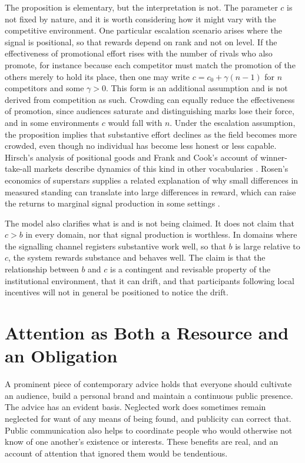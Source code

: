 \documentclass[11pt]{article}
\theoremstyle{definition}
\theoremstyle{remark}
\begin{document}
The proposition is elementary, but the interpretation is not. The parameter $c$ is not fixed by nature, and it is worth considering how it might vary with the competitive environment. One particular escalation scenario arises where the signal is positional, so that rewards depend on rank and not on level. If the effectiveness of promotional effort rises with the number of rivals who also promote, for instance because each competitor must match the promotion of the others merely to hold its place, then one may write $c = c_0 + \gamma(n-1)$ for $n$ competitors and some $\gamma > 0$. This form is an additional assumption and is not derived from competition as such. Crowding can equally reduce the effectiveness of promotion, since audiences saturate and distinguishing marks lose their force, and in some environments $c$ would fall with $n$. Under the escalation assumption, the proposition implies that substantive effort declines as the field becomes more crowded, even though no individual has become less honest or less capable. Hirsch's analysis of positional goods and Frank and Cook's account of winner-take-all markets describe dynamics of this kind in other vocabularies \cite{hirsch1976,frankcook1995}. Rosen's economics of superstars supplies a related explanation of why small differences in measured standing can translate into large differences in reward, which can raise the returns to marginal signal production in some settings \cite{rosen1981}.

The model also clarifies what is and is not being claimed. It does not claim that $c > b$ in every domain, nor that signal production is worthless. In domains where the signalling channel registers substantive work well, so that $b$ is large relative to $c$, the system rewards substance and behaves well. The claim is that the relationship between $b$ and $c$ is a contingent and revisable property of the institutional environment, that it can drift, and that participants following local incentives will not in general be positioned to notice the drift.

\section{Attention as Both a Resource and an Obligation}

A prominent piece of contemporary advice holds that everyone should cultivate an audience, build a personal brand and maintain a continuous public presence. The advice has an evident basis. Neglected work does sometimes remain neglected for want of any means of being found, and publicity can correct that. Public communication also helps to coordinate people who would otherwise not know of one another's existence or interests. These benefits are real, and an account of attention that ignored them would be tendentious.
\end{document}
